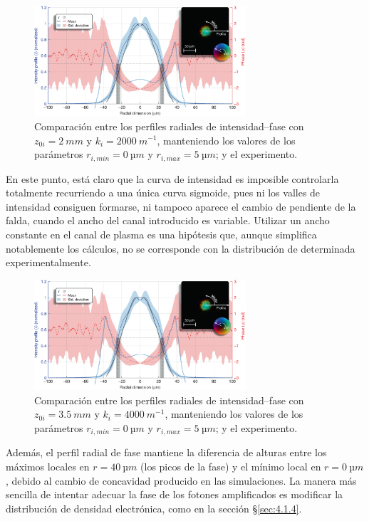 \begin{figure}[htbp]
  \centering
  \includegraphics[width=0.7\textwidth]{Figuras/ch4_cmp21.png}
  \caption{Comparación entre los perfiles radiales de intensidad--fase con $z_{0i}=\qty{2}{mm}$ y $k_{i}=\qty{2000}{m^{-1}}$, manteniendo los valores de los parámetros $r_{i,min}=\qty{0}{µm}$ y $r_{i,max}=\qty{5}{µm}$; y el experimento.}
  \label{fig:4.14}
\end{figure}

En este punto, está claro que la curva de intensidad es imposible controlarla totalmente recurriendo a una única curva sigmoide, pues ni los valles de intensidad consiguen formarse, ni tampoco aparece el cambio de pendiente de la falda, cuando el ancho del canal introducido es variable. Utilizar un ancho constante en el canal de plasma es una hipótesis que, aunque simplifica notablemente los cálculos, no se corresponde con la distribución de  determinada experimentalmente\autocite{Tuitje2020}.

\begin{figure}[htbp]
  \centering
  \includegraphics[width=0.7\textwidth]{Figuras/ch4_cmp22.png}
  \caption{Comparación entre los perfiles radiales de intensidad--fase con $z_{0i}=\qty{3.5}{mm}$ y $k_{i}=\qty{4000}{m^{-1}}$, manteniendo los valores de los parámetros $r_{i,min}=\qty{0}{µm}$ y $r_{i,max}=\qty{5}{µm}$; y el experimento.}
  \label{fig:4.15}
\end{figure}

Además, el perfil radial de fase mantiene la diferencia de alturas entre los máximos locales en $r=\qty{40}{µm}$ (los picos de la fase) y el mínimo local en $r=\qty{0}{µm}$, debido al cambio de concavidad producido en las simulaciones. La manera más sencilla de intentar adecuar la fase de los fotones amplificados es modificar la distribución de densidad electrónica, como en la sección \S\ref{sec:4.1.4}.

